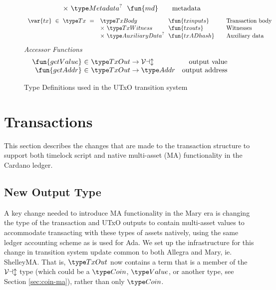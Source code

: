 \begin{figure*}[t!]
\begin{equation*}
\begin{array}{r@{~~}l@{~~}l@{\qquad}l}
      & \times ~\Metadata^? & \fun{md} & \text{metadata}
    \end{array}
  \end{equation*}
  \begin{equation*}
    \begin{array}{r@{~~}l@{~~}l@{\qquad}l}
      \var{tx} ~\in~ \Tx ~=~
      & \TxBody & \fun{txinputs}& \text{Transaction body}\\
      &\times ~\TxWitness & \fun{txouts}& \text{Witnesses}\\
      & \times ~\AuxiliaryData^? & \fun{txADhash} & \text{Auxiliary data}
    \end{array}
  \end{equation*}
  \emph{Accessor Functions}
  \begin{equation*}
    \begin{array}{r@{~\in~}lr}
      \fun{getValue} & \TxOut \to \ValClass & \text{output value} \\
      \fun{getAddr} & \TxOut \to \Addr & \text{output address}
    \end{array}
  \end{equation*}
  \caption{Type Definitions used in the UTxO transition system}
  \label{fig:defs:utxo-shelley}
\end{figure*}

\section{Transactions}
\label{sec:transactions}

This section describes the changes that are made to the
transaction structure to support both timelock script and native multi-asset (MA)
functionality in the Cardano ledger.

\subsection*{New Output Type}

A key change needed to introduce MA functionality in the Mary era is changing the type of
the transaction and UTxO outputs to contain multi-asset values to accommodate
transacting with these types of assets natively, using the same ledger accounting
scheme as is used for Ada. We set up the infrastructure for this
change in transition system update common to both Allegra and Mary, ie. ShelleyMA. That is,
$\TxOut$ now contains a term that is a member of the $\mathcal{Val}$ type (which
could be a $\Coin$, $\Value$, or another type, see Section \ref{sec:coin-ma}),
rather than only $\Coin$.

